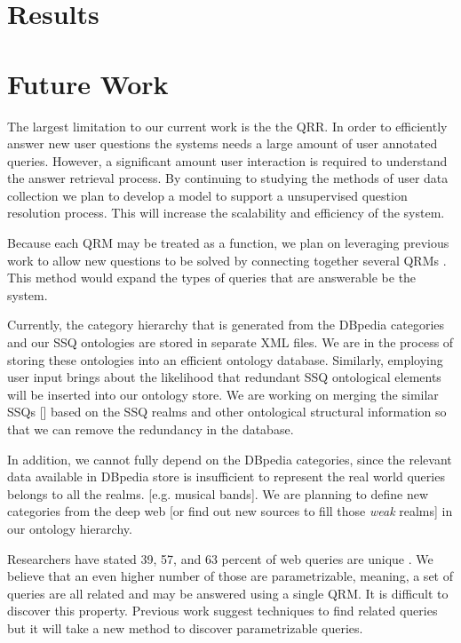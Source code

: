 \section{Results}

\section{Future Work}

The largest limitation to our current work is the the QRR.  In order to efficiently answer new user questions the systems needs a large amount of user annotated queries.  However, a significant amount user interaction is required to understand the answer retrieval process.  By continuing to studying the methods of user data collection we plan to develop a model to support a unsupervised question resolution process.  This will increase the scalability and efficiency of the system.

Because each QRM may be treated as a function, we plan on leveraging previous work to allow new questions to be solved by connecting together several QRMs \cite{morpheus1, transformscout}.  This method would expand the types of queries that are answerable be the system.

Currently, the category hierarchy that is generated from the DBpedia categories and our SSQ ontologies are stored in separate XML files. We are in the process of storing these ontologies into an efficient ontology database. Similarly, employing user input brings about the likelihood that redundant SSQ ontological elements will be inserted into our ontology store. We are working on merging the similar SSQs [\label{sec:ssq}] based on the SSQ realms and other ontological structural information so that we can remove the redundancy in the database.

In addition, we cannot fully depend on the DBpedia categories, since the relevant data available in DBpedia store is insufficient to represent the real world queries belongs to all the realms. [e.g. musical bands]. We are planning to define new categories from the deep web [or find out new sources to fill those \textit{weak} realms] in our ontology hierarchy.      

Researchers have stated 39, 57, and 63 percent of web queries are unique \cite{1277770,331405,621942}.  We believe that an even higher number of those are parametrizable, meaning, a set of queries are all related and may be answered using a single QRM.  It is difficult to discover this property.  Previous work suggest techniques to find related queries but it will take a new method to discover parametrizable queries.

